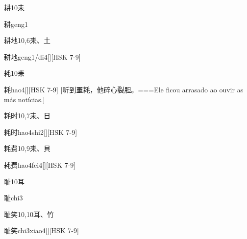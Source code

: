 \begin{Entry}{耕}{10}{⽾}
  \begin{Phonetics}{耕}{geng1}
  \end{Phonetics}
\end{Entry}

\begin{Entry}{耕地}{10,6}{⽾、⼟}
  \begin{Phonetics}{耕地}{geng1/di4}[][HSK 7-9]
  \end{Phonetics}
\end{Entry}

\begin{Entry}{耗}{10}{⽾}
  \begin{Phonetics}{耗}{hao4}[][HSK 7-9]
    [听到噩耗，他碎心裂胆。===Ele ficou arrasado ao ouvir as más notícias.]
  \end{Phonetics}
\end{Entry}

\begin{Entry}{耗时}{10,7}{⽾、⽇}
  \begin{Phonetics}{耗时}{hao4shi2}[][HSK 7-9]
  \end{Phonetics}
\end{Entry}

\begin{Entry}{耗费}{10,9}{⽾、⾙}
  \begin{Phonetics}{耗费}{hao4fei4}[][HSK 7-9]
  \end{Phonetics}
\end{Entry}

\begin{Entry}{耻}{10}{⽿}
  \begin{Phonetics}{耻}{chi3}
  \end{Phonetics}
\end{Entry}

\begin{Entry}{耻笑}{10,10}{⽿、⽵}
  \begin{Phonetics}{耻笑}{chi3xiao4}[][HSK 7-9]
  \end{Phonetics}
\end{Entry}

